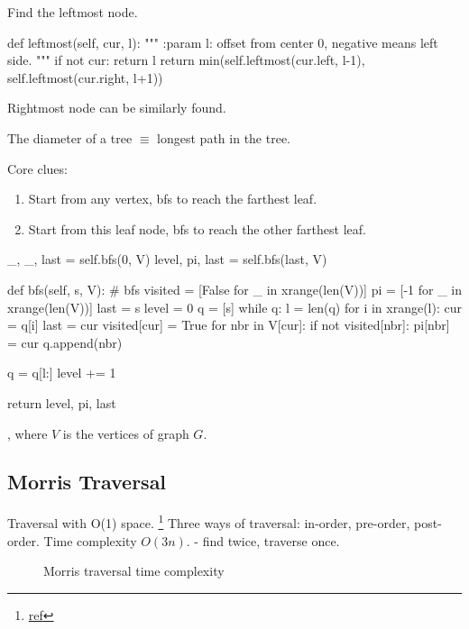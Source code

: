  Find the leftmost node. 
\begin{python}
def leftmost(self, cur, l):
    """
    :param l: offset from center 0, negative means left side. 
    """
    if not cur: return l
    return min(self.leftmost(cur.left, l-1), 
               self.leftmost(cur.right, l+1))
\end{python}

Rightmost node can be similarly found.

 The diameter of a tree $\equiv$ longest path in the tree.

Core clues:
\begin{enumerate}
\item Start from any vertex, bfs to reach the farthest leaf.
\item Start from this leaf node, bfs to reach the other farthest leaf. 
\end{enumerate}
\begin{python}
_, _, last = self.bfs(0, V)
level, pi, last = self.bfs(last, V)

def bfs(self, s, V):
    # bfs
    visited = [False for _ in xrange(len(V))]
    pi = [-1 for _ in xrange(len(V))]
    last = s
    level = 0
    q = [s]
    while q:
        l = len(q)
        for i in xrange(l):
            cur = q[i]
            last = cur
            visited[cur] = True
            for nbr in V[cur]:
                if not visited[nbr]:
                    pi[nbr] = cur
                    q.append(nbr)

        q = q[l:]
        level += 1

    return level, pi, last
\end{python}

, where $V$ is the vertices of graph $G$.


\newpag
\subsection{Morris Traversal} 
Traversal with O(1) space. \footnote{\href{http://www.cnblogs.com/AnnieKim/archive/2013/06/15/MorrisTraversal.html}{ref}}
Three ways of traversal: in-order, pre-order, post-order.
Time complexity $O(3n).$ - find  twice,  traverse once.
\begin{figure}[hbtp]
\centering
{}
\caption{Morris traversal time complexity}
\label{fig:morrisTime}
\end{figure}

